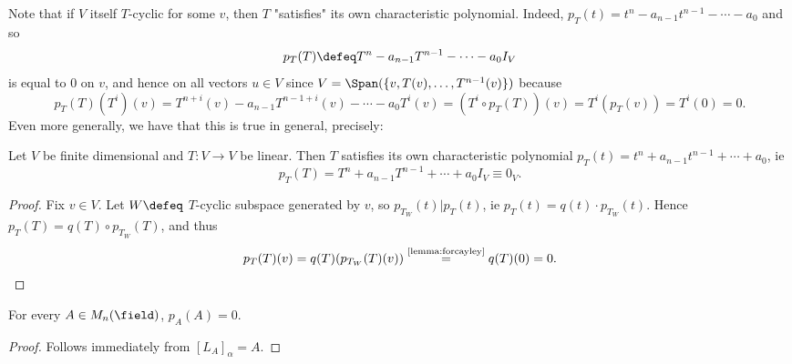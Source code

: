 \begin{remark}
    Note that if $V$ itself $T$-cyclic for some $v$, then $T$ "satisfies" its own characteristic polynomial. Indeed, $p_T(t) = t^n - a_{n-1}t^{n-1} - \cdots - a_0$ and so \[
    p_T(T) \defeq T^n - a_{n-1}T^{n-1} - \cdots - a_0 I_V 
    \]
    is equal to $0$ on $v$, and hence on all vectors $u \in V$ since $V = \Span (\{v, T(v), \dots, T^{n-1}(v)\})$ because $$p_T(T)(T^{i})(v) = T^{n+i}(v) - a_{n-1}T^{n-1+i}(v) - \cdots - a_0 T^{i}(v) = (T^{i} \circ p_T(T))(v) = T^{i}(p_T(v)) = T^{i}(0) = 0.$$ Even more generally, we have that this is true in general, precisely:
\end{remark}

\begin{theorem}
    Let $V$ be finite dimensional and $T : V \to V$ be linear. Then $T$ satisfies its own characteristic polynomial $p_T(t) = t^{n} + a_{n-1}t^{n-1} + \cdots + a_0$, ie \[
    p_T(T) = T^n + a_{n-1}T^{n-1} + \cdots + a_0I_V \equiv 0_V.    
    \]
\end{theorem}

\begin{proof}
    Fix $v \in V$. Let $W \defeq$ $T$-cyclic subspace generated by $v$, so $p_{T_W}(t) \vert p_T(t)$, ie $p_T(t) = q(t) \cdot p_{T_W}(t)$. Hence $p_T(T) = q(T) \circ p_{T_W}(T)$, and thus \begin{align*}
        p_T(T)(v) = q(T)(p_{T_W}(T)(v)) \overset{\text{\cref{lemma:forcayley}}}{=} q(T)(0) = 0.
    \end{align*}
\end{proof}

\begin{corollary}
    For every $A \in M_n(\field)$, $p_A(A) = 0$.
\end{corollary}

\begin{proof}
    Follows immediately from $[L_A]_\alpha = A$.
\end{proof}